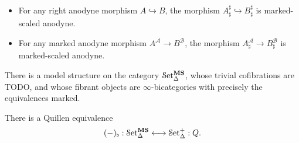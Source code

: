 \documentclass[main.tex]{subfiles}
\begin{document}
\begin{example}
  \label{prop:sharp_marked_right_anodyne}
  \leavevmode
  \begin{itemize}
    \item For any right anodyne morphism $A \hookrightarrow B$, the morphism $A^{\sharp}_{\sharp} \hookrightarrow B^{\sharp}_{\sharp}$ is marked-scaled anodyne.

    \item For any marked anodyne morphism $A^{\mathcal{A}} \to B^{\mathcal{B}}$, the morphism $A^{\mathcal{A}}_{\sharp} \to B^{\mathcal{B}}_{\sharp}$ is marked-scaled anodyne.
  \end{itemize}
\end{example}

\begin{theorem}
  There is a model structure on the category $\mathcal{S}\mathrm{et}_{\Delta}^{\mathbf{MS}}$, whose trivial cofibrations are TODO, and whose fibrant objects are $\infty$-bicategories with precisely the equivalences marked.
\end{theorem}

\begin{theorem}
  \label{thm:quillen_equiv_ms_and_scaled}
  There is a Quillen equivalence
  \begin{equation*}
    (-)_{\flat} : \mathcal{S}\mathrm{et}_{\Delta}^{\mathbf{MS}} \longleftrightarrow \mathcal{S}\mathrm{et}_{\Delta}^{+} : Q.
  \end{equation*}
\end{theorem}
\end{document}

